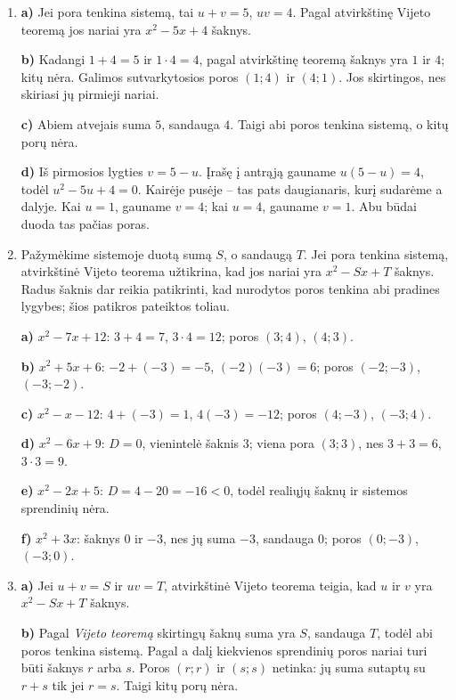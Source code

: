 \documentclass[12pt,a4paper]{article}
\begin{document}
\begin{enumerate}
\textbf{b)} Kadangi $1+3=4$ ir $1\cdot3=3$, pagal atvirkštinę Vijeto teoremą lygties šaknys yra $1$ ir $3$. Patikriname: įrašę jas į lygties kairę pusę, gauname $1-4+3=0$ ir $9-12+3=0$. Šaknų vidurkis yra $\frac{1+3}{2}=2$, taigi jis sutampa su duotu daugianario ekstremumo tašku.
\item \textbf{a)} Jei pora tenkina sistemą, tai $u+v=5$, $uv=4$. Pagal atvirkštinę Vijeto teoremą jos nariai yra $x^2-5x+4$ šaknys.

\textbf{b)} Kadangi $1+4=5$ ir $1\cdot4=4$, pagal atvirkštinę teoremą šaknys yra $1$ ir $4$; kitų nėra. Galimos sutvarkytosios poros $(1;4)$ ir $(4;1)$. Jos skirtingos, nes skiriasi jų pirmieji nariai.

\textbf{c)} Abiem atvejais suma $5$, sandauga $4$. Taigi abi poros tenkina sistemą, o kitų porų nėra.

\textbf{d)} Iš pirmosios lygties $v=5-u$. Įrašę į antrąją gauname $u(5-u)=4$, todėl $u^2-5u+4=0$. Kairėje pusėje – tas pats daugianaris, kurį sudarėme a dalyje. Kai $u=1$, gauname $v=4$; kai $u=4$, gauname $v=1$. Abu būdai duoda tas pačias poras.
\item Pažymėkime sistemoje duotą sumą $S$, o sandaugą $T$. Jei pora tenkina sistemą, atvirkštinė Vijeto teorema užtikrina, kad jos nariai yra $x^2-Sx+T$ šaknys. Radus šaknis dar reikia patikrinti, kad nurodytos poros tenkina abi pradines lygybes; šios patikros pateiktos toliau.

\textbf{a)} $x^2-7x+12$: $3+4=7$, $3\cdot4=12$; poros $(3;4)$, $(4;3)$.

\textbf{b)} $x^2+5x+6$: $-2+(-3)=-5$, $(-2)(-3)=6$; poros $(-2;-3)$, $(-3;-2)$.

\textbf{c)} $x^2-x-12$: $4+(-3)=1$, $4(-3)=-12$; poros $(4;-3)$, $(-3;4)$.

\textbf{d)} $x^2-6x+9$: $D=0$, vienintelė šaknis $3$; viena pora $(3;3)$, nes $3+3=6$, $3\cdot3=9$.

\textbf{e)} $x^2-2x+5$: $D=4-20=-16<0$, todėl realiųjų šaknų ir sistemos sprendinių nėra.

\textbf{f)} $x^2+3x$: šaknys $0$ ir $-3$, nes jų suma $-3$, sandauga $0$; poros $(0;-3)$, $(-3;0)$.
\item \textbf{a)} Jei $u+v=S$ ir $uv=T$, atvirkštinė Vijeto teorema teigia, kad $u$ ir $v$ yra $x^2-Sx+T$ šaknys.

\textbf{b)} Pagal \emph{Vijeto teoremą} skirtingų šaknų suma yra $S$, sandauga $T$, todėl abi poros tenkina sistemą. Pagal a dalį kiekvienos sprendinių poros nariai turi būti šaknys $r$ arba $s$. Poros $(r;r)$ ir $(s;s)$ netinka: jų suma sutaptų su $r+s$ tik jei $r=s$. Taigi kitų porų nėra.


\end{enumerate}
\end{document}
